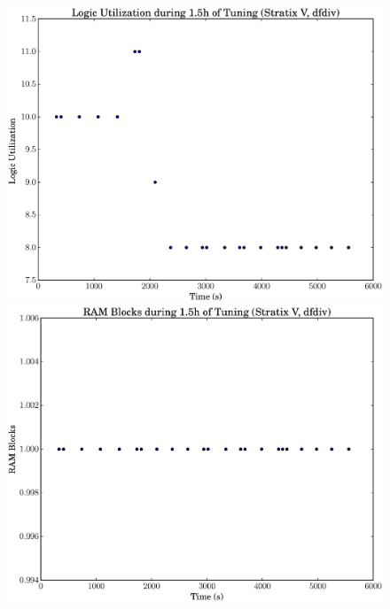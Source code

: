 \documentclass[12pt, a4paper]{article}
\begin{document}
\begin{figure}[htpb]
    \centering
    \noindent
    \begin{minipage}{.48\textwidth}
        \centering
        \includegraphics[scale=.25]{dfdiv_lu_5400_chstone_StratixV}
    \end{minipage}%
    \hfill
    \begin{minipage}{.48\textwidth}
        \centering
        \includegraphics[scale=.25]{dfdiv_ram_5400_chstone_StratixV}
    \end{minipage}%


\end{figure}
\end{document}
